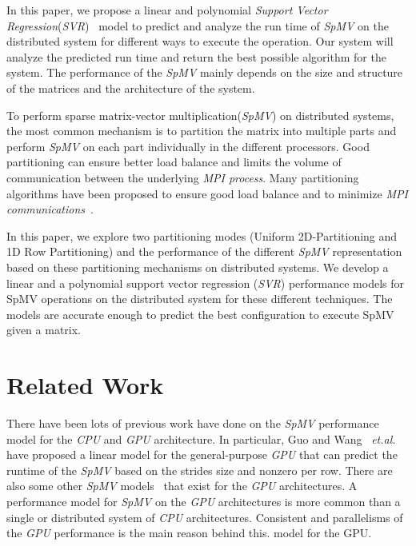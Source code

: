 \documentclass[conference, 10ppt]{IEEEtran}
\begin{document}
In this paper, we propose a linear and polynomial \textit{Support
  Vector Regression}(\textit{SVR})~\cite{awad2015support} model to predict and analyze the
run time of \textit{SpMV} on the distributed system for different ways
to execute the operation. Our system will analyze the predicted run
time and return the best possible algorithm for the system. The
performance of the \textit{SpMV} mainly depends on the size and
structure of the matrices and the architecture of the system. 

To perform sparse matrix-vector multiplication(\textit{SpMV}) on
distributed systems, the most common mechanism is to partition the
matrix into multiple parts and perform \textit{SpMV} on each part
individually in the different processors. Good partitioning can ensure
better load balance and limits the volume of communication between the
underlying \textit{MPI process}. Many partitioning
algorithms have been proposed to ensure good load balance and to
minimize \textit{MPI communications}~\cite{deveci2015hypergraph, karypis1995multilevel,
  kaya2013analysis}.

In this paper, we explore two partitioning modes (Uniform
2D-Partitioning and 1D Row Partitioning) and the performance of the
different \textit{SpMV} representation based on these partitioning
mechanisms on distributed systems. We develop a linear and a
polynomial support vector regression (\textit{SVR}) performance models
for SpMV operations on the distributed system for these different
techniques. The models are accurate enough to predict the best
configuration to execute SpMV given a matrix.

\section{Related Work}

There have been lots of previous work have done on the \textit{SpMV}
performance model for the \textit{CPU} and \textit{GPU}
architecture. In particular, Guo and Wang~\cite{guo2013performance}
\textit{et.al.} have proposed a linear model for the general-purpose
\textit{GPU} that can predict the runtime of the \textit{SpMV} based
on the strides size and nonzero per row. There are also some other
\textit{SpMV} models~\cite{nisa2018effective,guo2018performance} that
exist for the \textit{GPU} architectures. A performance model for
\textit{SpMV} on the \textit{GPU} architectures is more common than a
single or distributed system of \textit{CPU} architectures. Consistent
and parallelisms of the \textit{GPU} performance is the main reason
behind this.
model for the GPU. 
\end{document}
